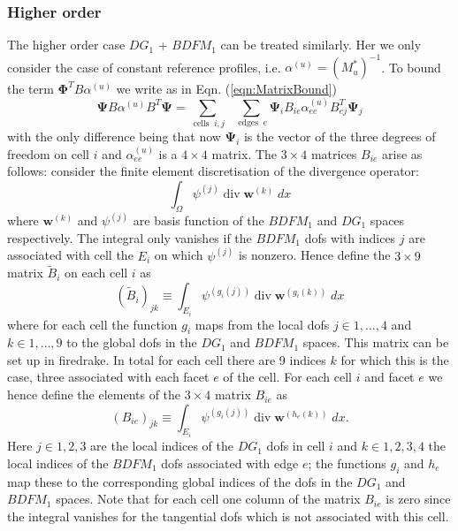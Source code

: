 \documentclass[12pt]{article}
\renewcommand{\vec}[1]{\boldsymbol{#1}}
\begin{document}
\subsubsection{Higher order}
The higher order case $DG_1$ + $BDFM_1$ can be treated similarly. Her we only consider the case of constant reference profiles, i.e. $\alpha^{(u)}=\left(M_u^*\right)^{-1}$.
To bound the term $\vec{\Phi}^T B\alpha^{(u)}$ we write as in Eqn. (\ref{eqn:MatrixBound})
\begin{equation}
  \vec{\Psi} B \alpha^{(u)} B^T \vec{\Psi} = \sum_{\operatorname{cells}\;i,j}\;\;\sum_{\operatorname{edges}\;e} \vec{\Psi}_i B_{ie} \alpha^{(u)}_{ee} B^T_{ej} \vec{\Psi}_j 
\label{eqn:MatrixBoundBDFM1}
\end{equation}
with the only difference being that now $\vec{\Psi}_i$ is the vector of the three degrees of freedom on cell $i$ and $\alpha^{(u)}_{ee}$ is a $4\times 4$ matrix. The $3\times 4$ matrices $B_{ie}$ arise as follows: consider the finite element discretisation of the divergence operator:
\begin{equation}
  \int_{\Omega} \psi^{(j)}\operatorname{div}\vec{w}^{(k)}\; dx
\end{equation}
where $\vec{w}^{(k)}$ and $\psi^{(j)}$ are basis function of the $BDFM_1$ and $DG_1$ spaces respectively. The integral only vanishes if the $BDFM_1$ dofs with indices $j$ are associated with cell the $E_i$ on which $\psi^{(j)}$ is nonzero. Hence define the $3\times 9$ matrix $\tilde{B}_i$ on each cell $i$ as
\begin{equation}
  \left(\tilde{B}_i\right)_{jk} \equiv \int_{E_i} \psi^{(g_i(j))}\operatorname{div}\vec{w}^{(g_i(k))}\; dx
\end{equation}
where for each cell the function $g_i$ maps from the local dofs $j\in1,\dots,4$ and $k\in1,\dots,9$ to the global dofs in the $DG_1$ and $BDFM_1$ spaces. This matrix can be set up in firedrake.
In total for each cell there are 9 indices $k$ for which this is the case, three associated with each facet $e$ of the cell. For each cell $i$ and facet $e$ we hence define the elements of the $3\times 4$ matrix $B_{ie}$ as
\begin{equation}
  (B_{ie})_{jk} \equiv \int_{E_i} \psi^{(g_i(j))} \operatorname{div}\vec{w}^{(h_e(k))}\; dx.
\end{equation}
Here $j\in1,2,3$ are the local indices of the $DG_1$ dofs in cell $i$ and $k\in1,2,3,4$ the local indices of the $BDFM_1$ dofs associated with edge $e$; the functions $g_i$ and $h_e$ map these to the corresponding global indices of the dofs in the $DG_1$ and $BDFM_1$ spaces. Note that for each cell one column of the matrix $B_{ie}$ is zero since the integral vanishes for the tangential dofs which is not associated with  this cell.
\end{document}
